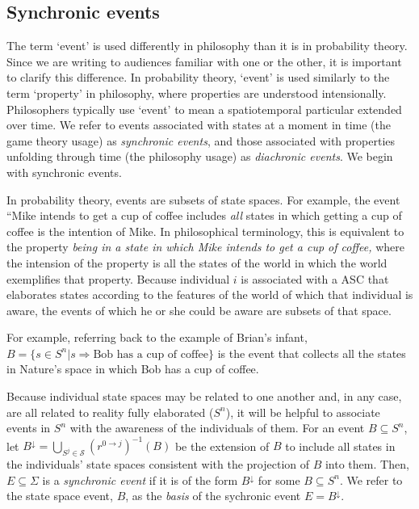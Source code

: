 \documentclass[
11pt,
titlepage,
reqno,
]{article}%
\theoremstyle{definition}
\begin{document}
	
\subsection{Synchronic events}

The term `event' is used differently in philosophy than it is in probability theory. 
Since we are writing to audiences familiar with one or the other, it is important to clarify this difference. 
In probability theory, `event' is used similarly to the term `property' in philosophy, where properties are understood intensionally. 
Philosophers typically use `event' to mean a spatiotemporal particular extended over time. 
We refer to events associated with states at a moment in time (the game theory usage) as \textit{synchronic events}, and those associated with properties unfolding through time (the philosophy usage) as \textit{diachronic events}.
We begin with synchronic events.
	
In probability theory, events are subsets of state spaces. 
For example, the event ``Mike intends to get a cup of coffee includes \textit{all} states in which getting a cup of coffee is the intention of Mike. 
In philosophical terminology, this is equivalent to the property \textit{being in a state in which Mike intends to get a cup of coffee,} where the intension of the property is all the states of the world in which the world exemplifies that property.
Because individual $i$ is associated with a ASC that elaborates states according to the features of the world of which that individual is aware, the events of which he or she could be aware are subsets of that space. 

For example, referring back to the example of Brian's infant, $B=\{s\in S^n|s\Rightarrow \text{Bob has a cup of coffee}\}$ is the event that collects all the states in Nature's space in which Bob has a cup of coffee.

Because individual state spaces may be related to one another and, in any case, are all related to reality fully elaborated ($S^n$), it will be helpful to associate events in $S^n$ with the awareness of the individuals of them.
For an event $B\subseteq S^n$, let $B^{\downarrow}=\bigcup_{S^j\in \mathcal{S}}\left(r^{0\rightarrow j}\right)^{-1}(B)$ be the extension of $B$ to include all states in the  individuals' state spaces consistent with the projection of $B$ into them.
Then, $E\subseteq \Sigma$ is a \textit{synchronic event} if it is of the form $B^{\downarrow}$ for some $B\subseteq S^n$.
We refer to the state space event, $B$, as the \textit{basis} of the sychronic event $E=B^{\downarrow}$.
	
\end{document}

